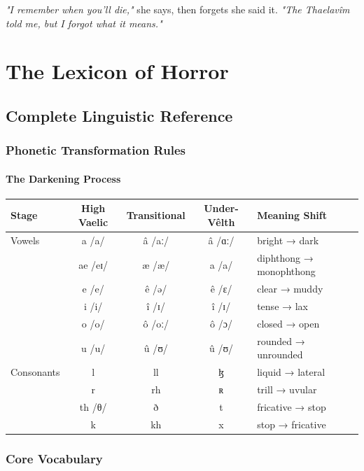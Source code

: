 \documentclass[11pt,a4paper,twoside]{book}
\begin{document}
\textit{"I remember when you'll die,"} she says, then forgets she said it. \textit{"The Thaelavîm told me, but I forgot what it means."}

\part{The Lexicon of Horror}

\chapter{Complete Linguistic Reference}

\section{Phonetic Transformation Rules}

\subsection{The Darkening Process}

\begin{center}
\begin{tabular}{|l|c|c|c|l|}
\hline
\textbf{Stage} & \textbf{High Vaelic} & \textbf{Transitional} & \textbf{Under-Vêlth} & \textbf{Meaning Shift} \\
\hline
Vowels & a /a/ & â /aː/ & â /ɑː/ & bright → dark \\
& ae /eɪ/ & æ /æ/ & a /a/ & diphthong → monophthong \\
& e /e/ & ê /ə/ & ê /ɛ/ & clear → muddy \\
& i /i/ & î /ɪ/ & î /ɪ/ & tense → lax \\
& o /o/ & ô /oː/ & ô /ɔ/ & closed → open \\
& u /u/ & û /ʊ/ & û /ʊ/ & rounded → unrounded \\
\hline
Consonants & l & ll & ɮ & liquid → lateral \\
& r & rh & ʀ & trill → uvular \\
& th /θ/ & ð & t & fricative → stop \\
& k & kh & x & stop → fricative \\
\hline
\end{tabular}
\end{center}

\section{Core Vocabulary}
\end{document}
